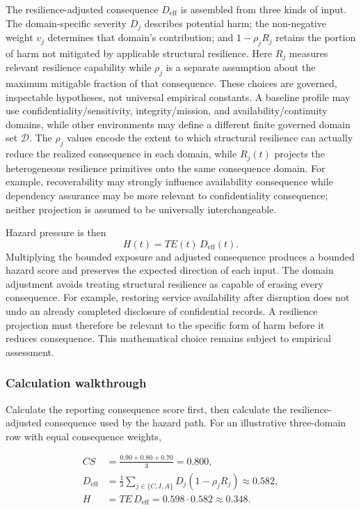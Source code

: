 \documentclass[11pt]{article}
\begin{document}
The resilience-adjusted consequence $D_{\mathrm{eff}}$ is assembled from
three kinds of input. The domain-specific severity $D_j$ describes
potential harm; the non-negative weight $v_j$ determines that domain's
contribution; and $1-\rho_jR_j$ retains the portion of harm not mitigated
by applicable structural resilience. Here $R_j$ measures relevant
resilience capability while $\rho_j$ is a separate assumption about the
maximum mitigable fraction of that consequence. These choices are
governed, inspectable hypotheses, not universal empirical constants.
A baseline profile may use confidentiality/sensitivity, integrity/mission, and
availability/continuity domains, while other environments may define a different
finite governed domain set $\mathcal{D}$. The $\rho_j$ values encode the extent to
which structural resilience can actually reduce the realized consequence in each
domain, while $R_j(t)$ projects the heterogeneous resilience primitives onto the
same consequence domain. For example, recoverability may strongly influence
availability consequence while dependency assurance may be more relevant to
confidentiality consequence; neither projection is assumed to be universally
interchangeable.

Hazard pressure is then
\begin{equation}
  H(t)=TE(t)\,D_{\mathrm{eff}}(t).
  \label{eq:hazard}
\end{equation}
Multiplying the bounded exposure and adjusted consequence produces a
bounded hazard score and preserves the expected direction of each input.
The domain adjustment avoids treating structural resilience as capable
of erasing every consequence. For example, restoring service availability
after disruption does not undo an already completed disclosure of
confidential records. A resilience projection must therefore be
relevant to the specific form of harm before it reduces consequence.
This mathematical choice remains subject to empirical assessment.

\subsubsection{Calculation walkthrough}
Calculate the reporting consequence score first, then calculate the resilience-adjusted
consequence used by the hazard path. For an illustrative three-domain row with equal
consequence weights,

\begin{align}
  CS &=\frac{0.90+0.80+0.70}{3}=0.800,\\
  D_{\mathrm{eff}}&=\frac{1}{3}\sum_{j\in\{C,I,A\}}
    D_j(1-\rho_jR_j)\approx0.582,\\
  H&=TE\,D_{\mathrm{eff}}=0.598\cdot0.582\approx0.348.
\end{align}
\end{document}
